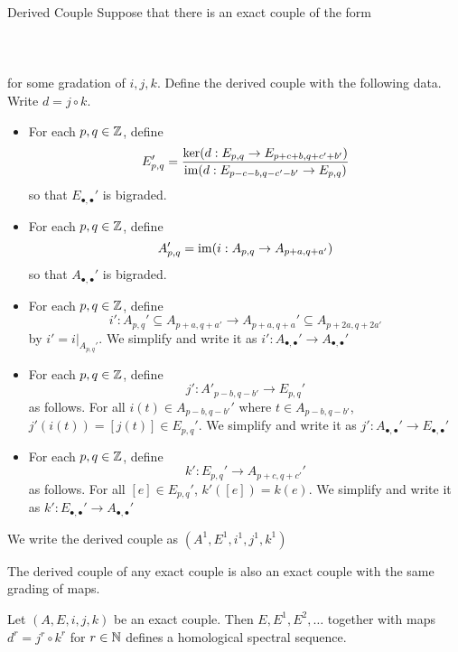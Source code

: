 \documentclass[a4paper]{article}
\begin{document}
\begin{defn}{Derived Couple}{} Suppose that there is an exact couple of the form \\~\\
\\~\\ for some gradation of $i,j,k$. Define the derived couple with the following data. Write $d=j\circ k$. 
\begin{itemize}
\item For each $p,q\in\mathbb{Z}$, define $$E_{p,q}'=\frac{\ker(d:E_{p,q}\to E_{p+c+b,q+c'+b'})}{\operatorname{im}(d:E_{p-c-b,q-c'-b'}\to E_{p,q})}$$ so that $E_{\bullet,\bullet}'$ is bigraded. 
\item For each $p,q\in\mathbb{Z}$, define $$A_{p,q}'=\operatorname{im}(i:A_{p,q}\to A_{p+a,q+a'})$$ so that $A_{\bullet,\bullet}'$ is bigraded. 
\item For each $p,q\in\mathbb{Z}$, define $$i':A_{p,q}'\subseteq A_{p+a,q+a'}\to A_{p+a,q+a}'\subseteq A_{p+2a,q+2a'}$$ by $i'=i|_{A_{p,q}'}$. We simplify and write it as $i':A_{\bullet,\bullet}'\to A_{\bullet,\bullet}'$
\item For each $p,q\in\mathbb{Z}$, define $$j':A'_{p-b,q-b'}\to E_{p,q}'$$ as follows. For all $i(t)\in A_{p-b,q-b'}'$ where $t\in A_{p-b,q-b'}$, $j'(i(t))=[j(t)]\in E_{p,q}'$. We simplify and write it as $j':A_{\bullet,\bullet}'\to E_{\bullet,\bullet}'$
\item For each $p,q\in\mathbb{Z}$, define $$k':E_{p,q}'\to A_{p+c,q+c'}'$$ as follows. For all $[e]\in E_{p,q}'$, $k'([e])=k(e)$. We simplify and write it as $k':E_{\bullet,\bullet}'\to A_{\bullet,\bullet}'$
\end{itemize}
We write the derived couple as $(A^1,E^1,i^1,j^1,k^1)$
\end{defn}

\begin{thm}{}{} The derived couple of any exact couple is also an exact couple with the same grading of maps. 
\end{thm}

\begin{thm}{}{} Let $(A,E,i,j,k)$ be an exact couple. Then $E,E^1,E^2,\dots$ together with maps $d^r=j^r\circ k^r$ for $r\in\mathbb{N}$ defines a homological spectral sequence. 
\end{thm}
\end{document}
